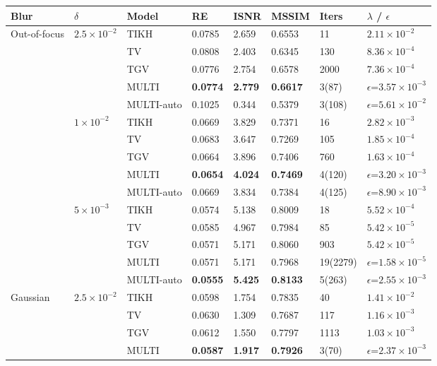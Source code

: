 \begin{tabular}{llllllll}
\toprule
Blur & $\delta$ & Model & RE & ISNR & MSSIM & Iters & $\lambda$ / $\epsilon$ \\
\midrule
\multirow{15}{*}{Out-of-focus} & \multirow{5}{*}{$2.5\times 10^{-2}$} & TIKH & 0.0785 & 2.659 & 0.6553 & 11 & $2.11\times 10^{-2}$ \\
 &  & TV & 0.0808 & 2.403 & 0.6345 & 130 & $8.36\times 10^{-4}$ \\
 &  & TGV & 0.0776 & 2.754 & 0.6578 & 2000 & $7.36\times 10^{-4}$ \\
 &  & MULTI & \textbf{0.0774} & \textbf{2.779} & \textbf{0.6617} & 3(87) & $\epsilon$=$3.57\times 10^{-3}$ \\
 &  & MULTI-auto & 0.1025 & 0.344 & 0.5379 & 3(108) & $\epsilon$=$5.61\times 10^{-2}$ \\
\cmidrule{2-8}
 & \multirow{5}{*}{$1\times 10^{-2}$} & TIKH & 0.0669 & 3.829 & 0.7371 & 16 & $2.82\times 10^{-3}$ \\
 &  & TV & 0.0683 & 3.647 & 0.7269 & 105 & $1.85\times 10^{-4}$ \\
 &  & TGV & 0.0664 & 3.896 & 0.7406 & 760 & $1.63\times 10^{-4}$ \\
 &  & MULTI & \textbf{0.0654} & \textbf{4.024} & \textbf{0.7469} & 4(120) & $\epsilon$=$3.20\times 10^{-3}$ \\
 &  & MULTI-auto & 0.0669 & 3.834 & 0.7384 & 4(125) & $\epsilon$=$8.90\times 10^{-3}$ \\
\cmidrule{2-8}
 & \multirow{5}{*}{$5\times 10^{-3}$} & TIKH & 0.0574 & 5.138 & 0.8009 & 18 & $5.52\times 10^{-4}$ \\
 &  & TV & 0.0585 & 4.967 & 0.7984 & 85 & $5.42\times 10^{-5}$ \\
 &  & TGV & 0.0571 & 5.171 & 0.8060 & 903 & $5.42\times 10^{-5}$ \\
 &  & MULTI & 0.0571 & 5.171 & 0.7968 & 19(2279) & $\epsilon$=$1.58\times 10^{-5}$ \\
 &  & MULTI-auto & \textbf{0.0555} & \textbf{5.425} & \textbf{0.8133} & 5(263) & $\epsilon$=$2.55\times 10^{-3}$ \\
\midrule
\multirow{15}{*}{Gaussian} & \multirow{5}{*}{$2.5\times 10^{-2}$} & TIKH & 0.0598 & 1.754 & 0.7835 & 40 & $1.41\times 10^{-2}$ \\
 &  & TV & 0.0630 & 1.309 & 0.7687 & 117 & $1.16\times 10^{-3}$ \\
 &  & TGV & 0.0612 & 1.550 & 0.7797 & 1113 & $1.03\times 10^{-3}$ \\
 &  & MULTI & \textbf{0.0587} & \textbf{1.917} & \textbf{0.7926} & 3(70) & $\epsilon$=$2.37\times 10^{-3}$ \\

\end{tabular}
